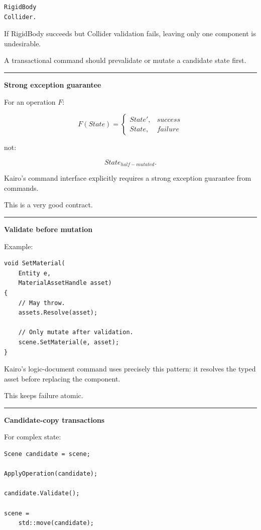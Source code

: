 \begin{verbatim}
RigidBody
Collider.
\end{verbatim}

If RigidBody succeeds but Collider validation fails, leaving only one component is undesirable.

A transactional command should prevalidate or mutate a candidate state first.

\begin{center}\rule{0.5\linewidth}{0.5pt}\end{center}

\textbf{Strong exception guarantee}

For an operation \(F\):

\[
F(State)=
\begin{cases}
State',&success\\
State,&failure
\end{cases}
\]

not:

\[
State_{half-mutated}.
\]

Kairo's command interface explicitly requires a strong exception guarantee from commands.

This is a very good contract.

\begin{center}\rule{0.5\linewidth}{0.5pt}\end{center}

\textbf{Validate before mutation}

Example:

\begin{verbatim}
void SetMaterial(
    Entity e,
    MaterialAssetHandle asset)
{
    // May throw.
    assets.Resolve(asset);

    // Only mutate after validation.
    scene.SetMaterial(e, asset);
}
\end{verbatim}

Kairo's logic-document command uses precisely this pattern: it resolves the typed asset before replacing the component.

This keeps failure atomic.

\begin{center}\rule{0.5\linewidth}{0.5pt}\end{center}

\textbf{Candidate-copy transactions}

For complex state:

\begin{verbatim}
Scene candidate = scene;

ApplyOperation(candidate);

candidate.Validate();

scene =
    std::move(candidate);
\end{verbatim}

